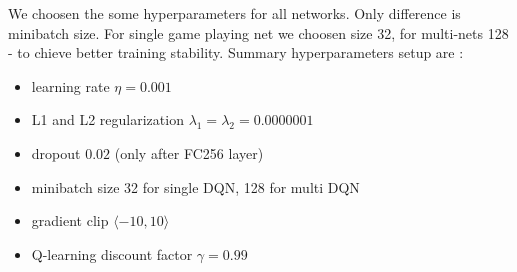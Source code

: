 \documentclass[10pt,a4paper]{article}
\begin{document}
We choosen the some hyperparameters for all networks. Only difference is minibatch size. For single game playing net we choosen size 32, for multi-nets 128 - to chieve better
training stability. Summary hyperparameters setup are :
\begin{itemize}
    \item learning rate $\eta = 0.001$
    \item L1 and L2 regularization $\lambda _1 = \lambda _2 = 0.0000001$
    \item dropout $0.02$ (only after FC256 layer)
    \item minibatch size 32 for single DQN, 128 for multi DQN
    \item gradient clip $\langle -10, 10 \rangle$
    \item Q-learning discount factor $\gamma = 0.99$
\end{itemize}
\end{document}
